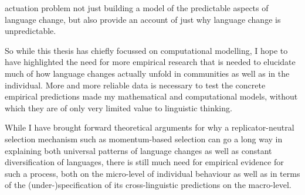 actuation problem
not just building a model of the predictable aspects of language change, but also provide an account of just why language change is unpredictable.



So while this thesis has chiefly focussed on computational modelling, I hope to have highlighted the need for more empirical research that is needed to elucidate much of how language changes actually unfold in communities as well as in the individual. More and more reliable data is necessary to test the concrete empirical predictions made my mathematical and computational models, without which they are of only very limited value to linguistic thinking.

While I have brought forward theoretical arguments for why a replicator-neutral selection mechanism such as momentum-based selection can go a long way in explaining both universal patterns of language changes as well as constant diversification of languages, there is still much need for empirical evidence for such a process, both on the micro-level of individual behaviour as well as in terms of the (under-)specification of its cross-linguistic predictions on the macro-level.

